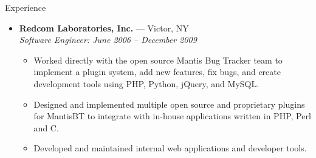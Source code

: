 \documentclass[11pt,oneside]{article}
\newenvironment{ressection}[1]{
    \vspace{8pt}
    {\fontfamily{phv}\selectfont\Large#1}
    \begin{itemize}
    \vspace{3pt}
}{
    \end{itemize}
}
\newcommand{\ressubitem}[1]{
    \vspace{-1pt}
    \item \begin{flushleft} #1 \end{flushleft}
}
\newcommand{\resbigitem}[3]{
    \vspace{-5pt}
    \item
    \textbf{#1} --- #2 \\
    \textit{#3}
}
\newenvironment{ressubsec}[3]{
    \resbigitem{#1}{#2}{#3}
    \vspace{-2pt}
    \begin{itemize}
}{
    \end{itemize}
}
\begin{document}
\begin{ressection}{Experience}

    \newpage

    \begin{ressubsec}{Redcom Laboratories, Inc.}{Victor, NY}
    {Software Engineer: June 2006 -- December 2009}
        \ressubitem{Worked directly with the open source Mantis Bug Tracker team to implement
        a plugin system, add new features, fix bugs, and create development tools using PHP, Python,
        jQuery, and MySQL.}
        \ressubitem{Designed and implemented multiple open source and proprietary plugins for MantisBT
        to integrate with in-house applications written in PHP, Perl and C.}
        \ressubitem{Developed and maintained internal web applications and developer tools.}
    \end{ressubsec}


\end{ressection}
\end{document}
